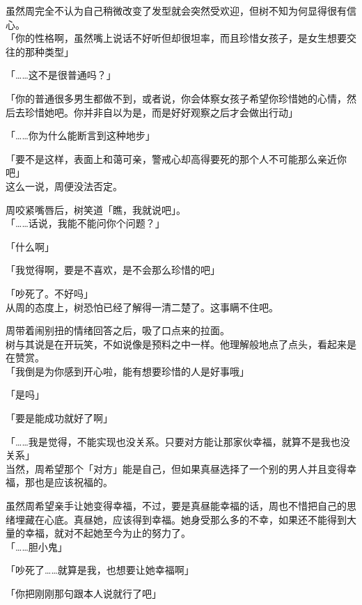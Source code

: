 虽然周完全不认为自己稍微改变了发型就会突然受欢迎，但树不知为何显得很有信心。\\

「你的性格啊，虽然嘴上说话不好听但却很坦率，而且珍惜女孩子，是女生想要交往的那种类型」

「……这不是很普通吗？」

「你的普通很多男生都做不到，或者说，你会体察女孩子希望你珍惜她的心情，然后去珍惜她吧。你并非自以为是，而是好好观察之后才会做出行动」

「……你为什么能断言到这种地步」

「要不是这样，表面上和蔼可亲，警戒心却高得要死的那个人不可能那么亲近你吧」\\

这么一说，周便没法否定。

周咬紧嘴唇后，树笑道「瞧，我就说吧」。\\

「……话说，我能不能问你个问题？」

「什么啊」

「我觉得啊，要是不喜欢，是不会那么珍惜的吧」

「吵死了。不好吗」\\

从周的态度上，树恐怕已经了解得一清二楚了。这事瞒不住吧。

周带着闹别扭的情绪回答之后，吸了口点来的拉面。\\

树与其说是在开玩笑，不如说像是预料之中一样。他理解般地点了点头，看起来是在赞赏。\\

「我倒是为你感到开心啦，能有想要珍惜的人是好事哦」

「是吗」

「要是能成功就好了啊」

「……我是觉得，不能实现也没关系。只要对方能让那家伙幸福，就算不是我也没关系」\\

当然，周希望那个「对方」能是自己，但如果真昼选择了一个别的男人并且变得幸福，那也是应该祝福的。

虽然周希望亲手让她变得幸福，不过，要是真昼能幸福的话，周也不惜把自己的思绪埋藏在心底。真昼她，应该得到幸福。她身受那么多的不幸，如果还不能得到大量的幸福，就对不起她至今为止的努力了。\\

「……胆小鬼」

「吵死了……就算是我，也想要让她幸福啊」

「你把刚刚那句跟本人说就行了吧」


